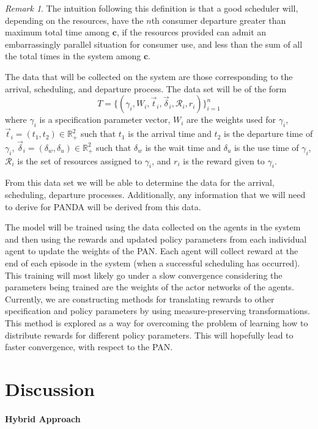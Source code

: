 \documentclass{article}
\theoremstyle{definition}
\theoremstyle{remark}
\newtheorem*{remark}{Remark}
\begin{document}
		\begin{remark}
			The intuition following this definition is that a good scheduler will, depending on the resources, have the $n$th consumer departure greater than maximum total time among $\mathbf{c}$, if the resources provided can admit an embarrassingly parallel situation for consumer use, and less than the sum of all the total times in the system among $\mathbf{c}$.
		\end{remark}
	
		The data that will be collected on the system are those corresponding to the arrival, scheduling, and departure process. The data set will be of the form
		\[
		T = \{(\gamma_{i}, W_{i},\vec{t}_{i}, \vec{\delta}_{i}, \mathcal{R}_{i}, r_{i})\}_{i = 1}^{n} 
		\]
		where $\gamma_{i}$ is a specification parameter vector, $W_{i}$ are the weights used for $\gamma_{i}$, $\vec{t}_{i} = (t_{1}, t_{2}) \in \mathbb{R}_{+}^{2}$ such that $t_{1}$ is the arrival time and $t_{2}$ is the departure time of $\gamma_{i}$, $\vec{\delta}_{i} = (\delta_{w}, \delta_{u}) \in \mathbb{R}_{+}^{2}$ such that $\delta_{w}$ is the wait time and $\delta_{u}$ is the use time of $\gamma_{i}$, $\mathcal{R}_{i}$ is the set of resources assigned to $\gamma_{i}$, and $r_{i}$ is the reward given to $\gamma_{i}$. 
		
		From this data set we will be able to determine the data for the arrival, scheduling, departure processes. Additionally, any information that we will need to derive for PANDA will be derived from this data. 
		
		The model will be trained using the data collected on the agents in the system and then using the rewards and updated policy parameters from each individual agent to update the weights of the PAN. Each agent will collect reward at the end of each episode in the system (when a successful scheduling has occurred). This training will most likely go under a slow convergence considering the parameters being trained are the weights of the actor networks of the agents. Currently, we are constructing methods for translating rewards to other specification and policy parameters by using measure-preserving transformations. This method is explored as a way for overcoming the problem of learning how to distribute rewards for different policy parameters. This will hopefully lead to faster convergence, with respect to the PAN.

	\section{Discussion}

		\paragraph{Hybrid Approach}
\end{document}
